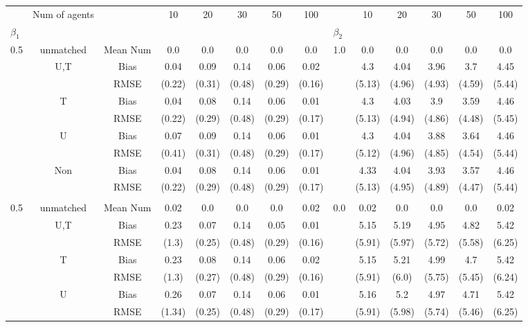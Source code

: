 \begin{tabular}{@{\extracolsep{5pt}}lc|cccccc|lccccc}
\toprule 
 & Num of agents &  & 10 & 20 & 30 & 50 & 100 &  & 10 & 20 & 30 & 50 & 100 \\
$\beta_1$ &  &  &  &  &  &  &  & $\beta_2$ &  &  &  &  &  \\
\midrule 
0.5 & unmatched & Mean Num & 0.0 & 0.0 & 0.0 & 0.0 & 0.0 & 1.0 & 0.0 & 0.0 & 0.0 & 0.0 & 0.0 \\
 & U,T & Bias & 0.04 & 0.09 & 0.14 & 0.06 & 0.02 &  & 4.3 & 4.04 & 3.96 & 3.7 & 4.45 \\
 &  & RMSE & (0.22) & (0.31) & (0.48) & (0.29) & (0.16) &  & (5.13) & (4.96) & (4.93) & (4.59) & (5.44) \\
 & T & Bias & 0.04 & 0.08 & 0.14 & 0.06 & 0.01 &  & 4.3 & 4.03 & 3.9 & 3.59 & 4.46 \\
 &  & RMSE & (0.22) & (0.29) & (0.48) & (0.29) & (0.17) &  & (5.13) & (4.94) & (4.86) & (4.48) & (5.45) \\
 & U & Bias & 0.07 & 0.09 & 0.14 & 0.06 & 0.01 &  & 4.3 & 4.04 & 3.88 & 3.64 & 4.46 \\
 &  & RMSE & (0.41) & (0.31) & (0.48) & (0.29) & (0.17) &  & (5.12) & (4.96) & (4.85) & (4.54) & (5.44) \\
 & Non & Bias & 0.04 & 0.08 & 0.14 & 0.06 & 0.01 &  & 4.33 & 4.04 & 3.93 & 3.57 & 4.46 \\
 &  & RMSE & (0.22) & (0.29) & (0.48) & (0.29) & (0.17) &  & (5.13) & (4.95) & (4.89) & (4.47) & (5.44) \\
 &  &  &  &  &  &  &  &  &  &  &  &  &  \\
0.5 & unmatched & Mean Num & 0.02 & 0.0 & 0.0 & 0.0 & 0.02 & 0.0 & 0.02 & 0.0 & 0.0 & 0.0 & 0.02 \\
 & U,T & Bias & 0.23 & 0.07 & 0.14 & 0.05 & 0.01 &  & 5.15 & 5.19 & 4.95 & 4.82 & 5.42 \\
 &  & RMSE & (1.3) & (0.25) & (0.48) & (0.29) & (0.16) &  & (5.91) & (5.97) & (5.72) & (5.58) & (6.25) \\
 & T & Bias & 0.23 & 0.08 & 0.14 & 0.06 & 0.02 &  & 5.15 & 5.21 & 4.99 & 4.7 & 5.42 \\
 &  & RMSE & (1.3) & (0.27) & (0.48) & (0.29) & (0.16) &  & (5.91) & (6.0) & (5.75) & (5.45) & (6.24) \\
 & U & Bias & 0.26 & 0.07 & 0.14 & 0.06 & 0.01 &  & 5.16 & 5.2 & 4.97 & 4.71 & 5.42 \\
 &  & RMSE & (1.34) & (0.25) & (0.48) & (0.29) & (0.17) &  & (5.91) & (5.98) & (5.74) & (5.46) & (6.25) \\

\end{tabular}

